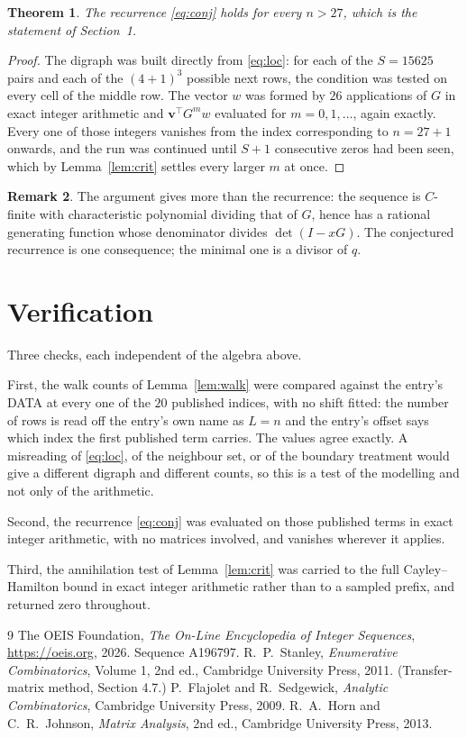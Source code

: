 \documentclass[11pt,a4paper]{article}
\theoremstyle{plain}
\newtheorem{theorem}{Theorem}
\theoremstyle{definition}
\newtheorem{remark}[theorem]{Remark}
\begin{document}
\begin{theorem}
The recurrence \eqref{eq:conj} holds for every $n>27$, which is the statement of
Section~1.
\end{theorem}

\begin{proof}
The digraph was built directly from \eqref{eq:loc}: for each of the $S=15625$ pairs and each
of the $(4+1)^{3}$ possible next rows, the condition was tested on every cell of
the middle row. The vector $w$ was formed by $26$ applications of $G$ in exact integer
arithmetic and $\mathbf{v}^{\!\top}G^{m}w$ evaluated for $m=0,1,\dots$, again exactly.
Every one of those integers vanishes from the index corresponding to $n=27+1$ onwards,
and the run was continued until $S+1$ consecutive zeros had been seen, which by
Lemma~\ref{lem:crit} settles every larger $m$ at once.
\end{proof}

\begin{remark}
The argument gives more than the recurrence: the sequence is $C$-finite with characteristic
polynomial dividing that of $G$, hence has a rational generating function whose denominator
divides $\det(I-xG)$. The conjectured recurrence is one consequence; the minimal one is a
divisor of $q$.
\end{remark}

\section{Verification}

Three checks, each independent of the algebra above.

First, the walk counts of Lemma~\ref{lem:walk} were compared against the entry's DATA at
every one of the $20$ published indices, with no shift fitted: the number of rows is
read off the entry's own name as $L=n$ and the entry's offset says which index the first
published term carries. The values agree exactly. A misreading of \eqref{eq:loc}, of the
neighbour set, or of the boundary treatment would give a different digraph and different
counts, so this is a test of the modelling and not only of the arithmetic.

Second, the recurrence \eqref{eq:conj} was evaluated on those published terms in exact
integer arithmetic, with no matrices involved, and vanishes wherever it applies.

Third, the annihilation test of Lemma~\ref{lem:crit} was carried to the full
Cayley--Hamilton bound in exact integer arithmetic rather than to a sampled prefix, and
returned zero throughout.

\begin{thebibliography}{9}
 The OEIS Foundation, \emph{The On-Line Encyclopedia of Integer
Sequences}, \url{https://oeis.org}, 2026. Sequence A196797.
 R.~P.~Stanley, \emph{Enumerative Combinatorics}, Volume 1, 2nd ed.,
Cambridge University Press, 2011. (Transfer-matrix method, Section 4.7.)
 P.~Flajolet and R.~Sedgewick, \emph{Analytic Combinatorics}, Cambridge
University Press, 2009.
 R.~A.~Horn and C.~R.~Johnson, \emph{Matrix Analysis}, 2nd ed., Cambridge
University Press, 2013.
\end{thebibliography}
\end{document}
